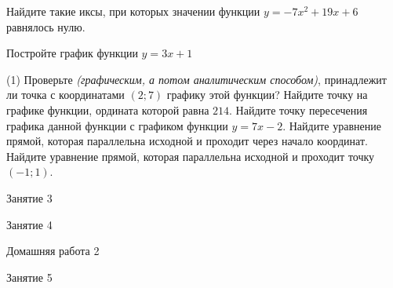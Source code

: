 \begin{homework}[number=1]
	\begin{listofex}
		\item Найдите такие иксы, при которых значении функции \( y=-7x^2+19x+6 \) равнялось нулю.
		\item Постройте график функции \( y=3x+1 \)
		\begin{tasks}(1)
			\task Проверьте \textit{(графическим, а потом аналитическим способом)}, принадлежит ли точка с координатами \( (2;7) \) графику этой функции?
			\task Найдите точку на графике функции, ордината которой равна \( 214 \).
			\task Найдите точку пересечения графика данной функции с графиком функции \( y=7x-2 \).
			\task Найдите уравнение прямой, которая параллельна исходной и проходит через начало координат.
			\task Найдите уравнение прямой, которая параллельна исходной и проходит точку \( (-1;1) \).
		\end{tasks}
		\item {}
	\end{listofex}
\end{homework}

\begin{class}[number=3]
	\begin{listofex}
		\item Занятие 3 
	\end{listofex}
\end{class}

\begin{class}[number=4]
	\begin{listofex}
		\item Занятие 4
	\end{listofex}
\end{class}

\begin{homework}[number=2]
	\begin{listofex}
		\item Домашняя работа 2
	\end{listofex}
\end{homework}

\begin{class}[number=5]
	\begin{listofex}
		\item Занятие 5
	\end{listofex}
\end{class}

